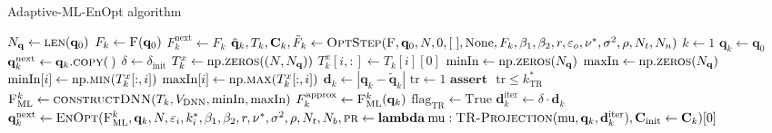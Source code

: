 \begin{algorithm}[H]%
\caption{\label{AML-EnOpt}Adaptive-ML-EnOpt algorithm}
\begin{algorithmic}[1]
\State $N_\mathbf{q}\gets\Call{len}{\mathbf{q}_0}$
\State $F_k\gets \Call{F}{\mathbf{q}_0}$
\State $F^\mathrm{next}_k \gets F_k$
\State\label{FOMOptStepAML1} $\tilde{\mathbf{q}}_k,T_k,\mathbf{C}_k,\tilde{F}_k\gets\Call{OptStep}{\textproc{F}, \mathbf{q}_0, N, 0, [\;], \mathrm{None}, F_k, \beta_1, \beta_2, r, \varepsilon_o, \nu^*, \sigma^2, \rho, N_t, N_n}$
\State $k\gets 1$
\State $\mathbf{q}_k \gets \mathbf{q}_0$
\State $\mathbf{q}^\mathrm{next}_k \gets \mathbf{q}_k.\Call{copy}{\:}$
\State\label{deltaInitAML} $\delta \gets \delta_\mathrm{init}$
\State\label{minMaxInAlg1} $T^x_k \gets \mathrm{np.}\Call{zeros}{(N, N_\mathbf{q})}$
\State $T^x_k[i,:] \gets T_k[i][0]$
\EndFor
\State $\mathrm{minIn} \gets \mathrm{np.}\Call{zeros}{N_\mathbf{q}}$
\State $\mathrm{maxIn} \gets \mathrm{np.}\Call{zeros}{N_\mathbf{q}}$
\State $\mathrm{minIn}[i] \gets \mathrm{np.}\Call{min}{T^x_k[:,i]}$
\State\label{minMaxInAlg2} $\mathrm{maxIn}[i] \gets \mathrm{np.}\Call{max}{T^x_k[:,i]}$
\EndFor
\State\label{d_kDefAML} $\mathbf{d}_k\gets|\mathbf{q}_k-\tilde{\mathbf{q}}_k|$
\State $\mathrm{tr}\gets1$
\State $\mathbf{assert}\text{ }\mathrm{tr}\leq k^*_\mathrm{TR}$
\State\label{surrogateDefAML} $\textproc{F$_\mathrm{ML}^k$}\gets \Call{constructDNN}{T_k, V_\mathrm{DNN}, \mathrm{minIn}, \mathrm{maxIn}}$
\State $F^\mathrm{approx}_k\gets \Call{F$_\mathrm{ML}^k$}{\mathbf{q}_k}$
\State $\mathrm{flag}_\mathrm{TR}\gets \mathrm{True}$
\State $\mathbf{d}^\mathrm{iter}_k\gets\delta\cdot\mathbf{d}_k$
\State\label{innerIterationCallAlgo} $\mathbf{q}^\mathrm{next}_k\gets\Call{EnOpt}{\textproc{F$_\mathrm{ML}^k$},\mathbf{q}_k,N,\varepsilon_i,k_i^*,\beta_1, \beta_2,r,\nu^*, \sigma^2, \rho, N_t, N_b, \textproc{pr}\gets\mathbf{lambda}\:\mathrm{mu}:\protect\Call{TR-Projection}{\mathrm{mu}, \mathbf{q}_k, \mathbf{d}^\mathrm{iter}_k}, \mathbf{C}_\mathrm{init}\gets\mathbf{C}_k}[0]$

\end{algorithmic}
\end{algorithm}
